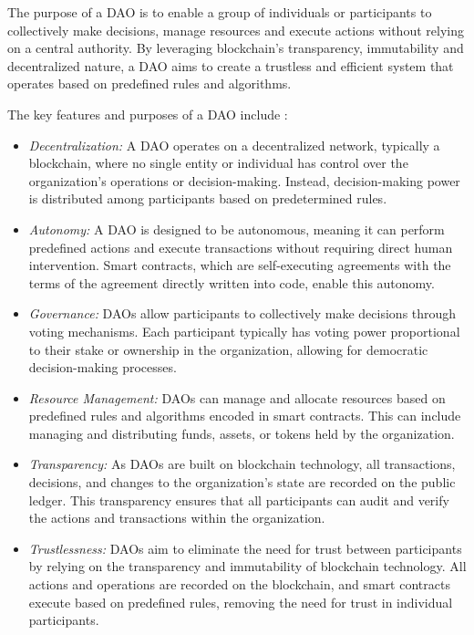 The purpose of a DAO is to enable a group of individuals or participants to collectively make decisions, manage resources and execute actions without relying on a central authority. By leveraging blockchain's transparency, immutability and decentralized nature, a DAO aims to create a trustless and efficient system that operates based on predefined rules and algorithms.\newline

The key features and purposes of a DAO include \cite{dao, dao2, dao3}:

\begin{itemize}
    \item \textit{Decentralization:} A DAO operates on a decentralized network, typically a blockchain, where no single entity or individual has control over the organization's operations or decision-making. Instead, decision-making power is distributed among participants based on predetermined rules.
    \item \textit{Autonomy:} A DAO is designed to be autonomous, meaning it can perform predefined actions and execute transactions without requiring direct human intervention. Smart contracts, which are self-executing agreements with the terms of the agreement directly written into code, enable this autonomy.
    \item \textit{Governance:} DAOs allow participants to collectively make decisions through voting mechanisms. Each participant typically has voting power proportional to their stake or ownership in the organization, allowing for democratic decision-making processes.
    \item \textit{Resource Management:} DAOs can manage and allocate resources based on predefined rules and algorithms encoded in smart contracts. This can include managing and distributing funds, assets, or tokens held by the organization.
    \item \textit{Transparency:} As DAOs are built on blockchain technology, all transactions, decisions, and changes to the organization's state are recorded on the public ledger. This transparency ensures that all participants can audit and verify the actions and transactions within the organization.
    \item \textit{Trustlessness:} DAOs aim to eliminate the need for trust between participants by relying on the transparency and immutability of blockchain technology. All actions and operations are recorded on the blockchain, and smart contracts execute based on predefined rules, removing the need for trust in individual participants.
\end{itemize}

